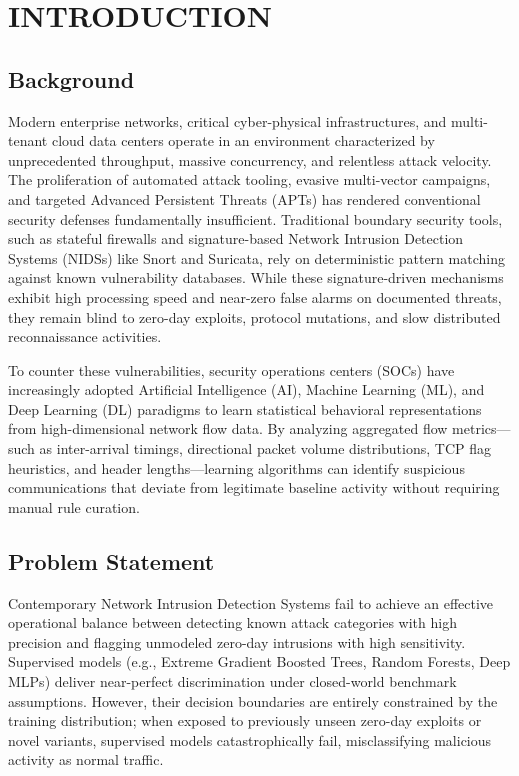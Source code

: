 \documentclass[12pt,a4paper]{report}
\begin{document}
\clearpage
{}
\setcounter{page}{1}


\chapter{INTRODUCTION}

\section{Background}
Modern enterprise networks, critical cyber-physical infrastructures, and multi-tenant cloud data centers operate in an environment characterized by unprecedented throughput, massive concurrency, and relentless attack velocity. The proliferation of automated attack tooling, evasive multi-vector campaigns, and targeted Advanced Persistent Threats (APTs) has rendered conventional security defenses fundamentally insufficient. Traditional boundary security tools, such as stateful firewalls and signature-based Network Intrusion Detection Systems (NIDSs) like Snort and Suricata, rely on deterministic pattern matching against known vulnerability databases. While these signature-driven mechanisms exhibit high processing speed and near-zero false alarms on documented threats, they remain blind to zero-day exploits, protocol mutations, and slow distributed reconnaissance activities.

To counter these vulnerabilities, security operations centers (SOCs) have increasingly adopted Artificial Intelligence (AI), Machine Learning (ML), and Deep Learning (DL) paradigms to learn statistical behavioral representations from high-dimensional network flow data. By analyzing aggregated flow metrics---such as inter-arrival timings, directional packet volume distributions, TCP flag heuristics, and header lengths---learning algorithms can identify suspicious communications that deviate from legitimate baseline activity without requiring manual rule curation.

\section{Problem Statement}
Contemporary Network Intrusion Detection Systems fail to achieve an effective operational balance between detecting known attack categories with high precision and flagging unmodeled zero-day intrusions with high sensitivity. Supervised models (e.g., Extreme Gradient Boosted Trees, Random Forests, Deep MLPs) deliver near-perfect discrimination under closed-world benchmark assumptions. However, their decision boundaries are entirely constrained by the training distribution; when exposed to previously unseen zero-day exploits or novel variants, supervised models catastrophically fail, misclassifying malicious activity as normal traffic.
\end{document}

